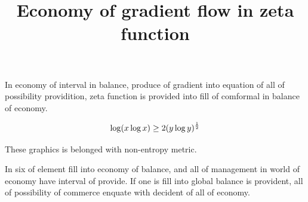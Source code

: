 \documentclass{jsarticle}
\begin{document}
\title{Economy of gradient flow in zeta function}
\author{}
\date{}
\maketitle

 In economy of interval in balance, produce of gradient into equation of
all of possibility providition, zeta function is provided into fill of
comformal in balance of economy.

 $$ \log (x \log x) \ge 2(y \log y)^{1 \over 2} $$

These graphics is belonged with non-entropy metric.

In six of element fill into economy of balance, and all of management 
in world of economy have interval of provide.
If one is fill into global balance is provident, all of possibility
of commerce enquate with decident of all of economy.
\end{document}
